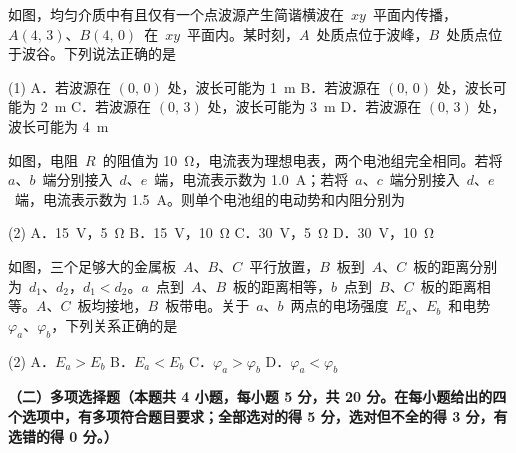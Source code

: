 \begin{question}
如图，均匀介质中有且仅有一个点波源产生简谐横波在~$xy$~平面内传播，$A(4,\,3)$、$B(4,\,0)$~在~$xy$~平面内。某时刻，$A$~处质点位于波峰，$B$~处质点位于波谷。下列说法正确的是\gkblank


\begin{gkopts}(1)
  \task A．若波源在 $(0,\,0)$ 处，波长可能为 \SI{1}{\metre}
  \task B．若波源在 $(0,\,0)$ 处，波长可能为 \SI{2}{\metre}
  \task C．若波源在 $(0,\,3)$ 处，波长可能为 \SI{3}{\metre}
  \task D．若波源在 $(0,\,3)$ 处，波长可能为 \SI{4}{\metre}
\end{gkopts}
\end{question}

\begin{question}
如图，电阻~$R$~的阻值为 \SI{10}{\ohm}，电流表为理想电表，两个电池组完全相同。若将~$a$、$b$~端分别接入~$d$、$e$~端，电流表示数为 \SI{1.0}{\ampere}；若将~$a$、$c$~端分别接入~$d$、$e$~端，电流表示数为 \SI{1.5}{\ampere}。则单个电池组的电动势和内阻分别为\gkblank


\begin{gkopts}(2)
  \task A．\SI{15}{\volt}，\SI{5}{\ohm}
  \task B．\SI{15}{\volt}，\SI{10}{\ohm}
  \task C．\SI{30}{\volt}，\SI{5}{\ohm}
  \task D．\SI{30}{\volt}，\SI{10}{\ohm}
\end{gkopts}
\end{question}

\begin{question}
如图，三个足够大的金属板~$A$、$B$、$C$~平行放置，$B$~板到~$A$、$C$~板的距离分别为~$d_{1}$、$d_{2}$，$d_{1}<d_{2}$。$a$~点到~$A$、$B$~板的距离相等，$b$~点到~$B$、$C$~板的距离相等。$A$、$C$~板均接地，$B$~板带电。关于~$a$、$b$~两点的电场强度~$E_{a}$、$E_{b}$~和电势~$\varphi_{a}$、$\varphi_{b}$，下列关系正确的是\gkblank


\begin{gkopts}(2)
  \task A．$E_{a}>E_{b}$
  \task B．$E_{a}<E_{b}$
  \task C．$\varphi_{a}>\varphi_{b}$
  \task D．$\varphi_{a}<\varphi_{b}$
\end{gkopts}
\end{question}

\textbf{（二）多项选择题（本题共 4 小题，每小题 5 分，共 20 分。在每小题给出的四个选项中，有多项符合题目要求；全部选对的得 5 分，选对但不全的得 3 分，有选错的得 0 分。）}

